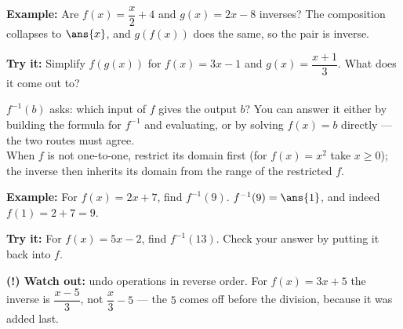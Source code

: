 \documentclass[12pt]{article}
\begin{document}
\begin{examplebox}
\textbf{Example:} Are $f(x) = \dfrac{x}{2} + 4$ and $g(x) = 2x - 8$ inverses?
The composition collapses to $\ans{x}$, and $g(f(x))$ does the same, so the
pair is inverse.
\end{examplebox}

\begin{tryitbox}
\textbf{Try it:} Simplify $f(g(x))$ for $f(x) = 3x - 1$ and
$g(x) = \dfrac{x+1}{3}$. What does it come out to?\\[2pt]
\end{tryitbox}


\begin{formulabox}
$f^{-1}(b)$ asks: which input of $f$ gives the output $b$? You can answer it
either by building the formula for $f^{-1}$ and evaluating, or by solving
$f(x) = b$ directly --- the two routes must agree.\\[2pt]
When $f$ is not one-to-one, restrict its domain first (for $f(x) = x^2$ take
$x \ge 0$); the inverse then inherits its domain from the range of the
restricted $f$.
\end{formulabox}

\begin{examplebox}
\textbf{Example:} For $f(x) = 2x + 7$, find $f^{-1}(9)$.
$f^{-1}(9) = \ans{1}$, and indeed $f(1) = 2 + 7 = 9$.
\end{examplebox}

\begin{tryitbox}
\textbf{Try it:} For $f(x) = 5x - 2$, find $f^{-1}(13)$. Check your answer by
putting it back into $f$.\\[2pt]
\end{tryitbox}

\begin{watchoutbox}
\textbf{(!) Watch out:} undo operations in reverse order. For
$f(x) = 3x + 5$ the inverse is $\dfrac{x-5}{3}$, not $\dfrac{x}{3} - 5$ --- the
$5$ comes off before the division, because it was added last.
\end{watchoutbox}
\end{document}
